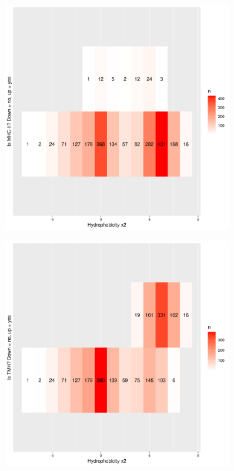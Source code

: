 \begin{figure}[!htbp]
  \includegraphics[width=0.9\textwidth]{p_bind_per_hydrophobicity/hydrophobicity_vs_binds_mhc2.png}
  \caption{
  }
  \label{fig:hydrophobicity_vs_binds_mhc2}
\end{figure}

\begin{figure}[!htbp]
  \includegraphics[width=0.9\textwidth]{p_bind_per_hydrophobicity/hydrophobicity_vs_is_tmh.png}
  \caption{
  }
  \label{fig:hydrophobicity_vs_is_tmh}
\end{figure}

